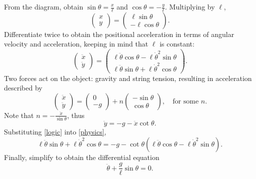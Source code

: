 \documentclass{article}
\begin{document}
From the diagram, obtain $\sin\theta = \frac{x}{\ell}$ and $\cos\theta = -\frac{y}{\ell}$. Multiplying by $\ell$,
\begin{equation*}
  \begin{pmatrix} x \\ y \end{pmatrix} = \begin{pmatrix} \ell\sin\theta \\ -\ell\cos\theta \end{pmatrix}.
\end{equation*}
Differentiate twice to obtain the positional acceleration in terms of angular velocity and acceleration, keeping in mind that $\ell$ is constant:
\begin{equation}
  \begin{pmatrix} \ddot{x} \\ \ddot{y} \end{pmatrix} = \begin{pmatrix} \ell\ddot\theta\cos\theta - \ell\dot\theta^2\sin\theta \\ \ell\ddot\theta\sin\theta + \ell\dot\theta^2\cos\theta \end{pmatrix}.
  \label{logic}
\end{equation}
Two forces act on the object: gravity and string tension, resulting in acceleration described by
\begin{equation*}
  \begin{pmatrix} \ddot{x} \\ \ddot{y} \end{pmatrix} = \begin{pmatrix} 0 \\ -g \end{pmatrix} + n\begin{pmatrix} -\sin\theta \\ \cos\theta \end{pmatrix}, \quad \text{for some $n$}.
\end{equation*}
Note that $n = -\frac{\ddot{x}}{\sin\theta}$, thus
\begin{equation}
  \ddot{y} = -g - \ddot{x}\cot\theta.
  \label{physics}
\end{equation}
Substituting \eqref{logic} into \eqref{physics},
\begin{equation*}
  \ell\ddot\theta\sin\theta + \ell\dot\theta^2\cos\theta = -g -\cot\theta \left( \ell\ddot\theta\cos\theta - \ell\dot\theta^2\sin\theta \right).
\end{equation*}
Finally, simplify to obtain the differential equation
\begin{equation*}
  \ddot\theta + \frac{g}{\ell}\sin\theta = 0.
\end{equation*}
\end{document}
